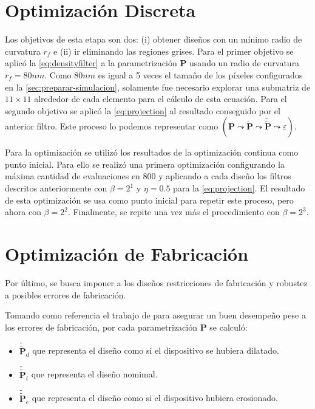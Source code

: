 \section{Optimización Discreta}

Los objetivos de esta etapa son dos: (i) obtener diseños con un mínimo radio de curvatura $r_f$ e
(ii) ir eliminando las regiones grises.
Para el primer objetivo se aplicó la \autoref{eq:densityfilter} a la parametrización 
$\boldsymbol{P}$ usando un radio de curvatura $r_f = 80 nm$.
Como $80nm$ es igual a 5 veces el tamaño de los píxeles configurados en la \autoref{sec:preparar-simulacion},
solamente fue necesario explorar una submatriz de $11 \times 11$ alrededor de cada elemento para el cálculo de
esta ecuación.
Para el segundo objetivo se aplicó la \autoref{eq:projection} al resultado conseguido por el anterior filtro.
Este proceso lo podemos representar como 
$(\boldsymbol{P} \mathrel{\leadsto} \widetilde{\boldsymbol{P}} \mathrel{\leadsto}
\widetilde{\widetilde{\boldsymbol{P}}} \mathrel{\leadsto} \varepsilon)$.

Para la optimización se utilizó los resultados de la optimización continua como punto inicial.
Para ello se realizó una primera optimización configurando la máxima cantidad de evaluaciones 
en 800 y aplicando a cada diseño los filtros descritos anteriormente con $\beta = 2^1$ y $\eta = 0.5$
para la \autoref{eq:projection}.
El resultado de esta optimización se usa como punto inicial para repetir este proceso, pero ahora con $\beta
= 2^2$. Finalmente, se repite una vez más el procedimiento con $\beta = 2^3$.

\section{Optimización de Fabricación}

Por último, se busca imponer a los diseños restricciones de fabricación y robustez a posibles errores
de fabricación. 

Tomando como referencia el trabajo de \cite{Hammond20} para asegurar un buen desempeño pese a los errores de
fabricación, por cada parametrización $\boldsymbol{P}$ se calculó:

\begin{itemize}
  \item $\widetilde{\widetilde{\boldsymbol{P}}}_{d}$ que representa el diseño como si el dispositivo se hubiera dilatado.
  \item $\widetilde{\widetilde{\boldsymbol{P}}}_{i}$ que representa el diseño nomimal.
  \item $\widetilde{\widetilde{\boldsymbol{P}}}_{e}$  que representa el diseño como si el dispositivo
    hubiera erosionado.
\end{itemize}

